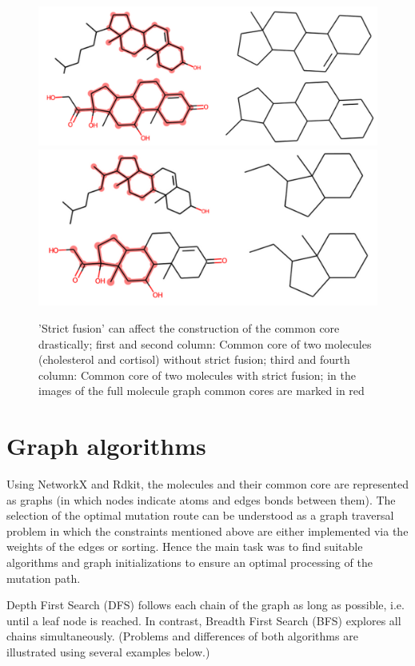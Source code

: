 \begin{figure}
\includegraphics[scale=0.4]{sterols_wo_strictfusion}\includegraphics[scale=0.4]{sterols_w_strictfusion}

\caption{'Strict fusion' can affect the construction of the common core drastically; first and second column: Common core of two molecules (cholesterol
and cortisol) without strict fusion; third and fourth column: Common
core of two molecules with strict fusion; in the images of the full molecule graph common cores are marked in red }

\end{figure}


\section{Graph algorithms}

Using NetworkX and Rdkit, the molecules and their common core are
represented as graphs (in which nodes indicate atoms and edges bonds
between them). The selection of the optimal mutation route can be
understood as a graph traversal problem in which the constraints mentioned
above are either implemented via the weights of the edges or sorting.
Hence the main task was to find suitable algorithms and graph initializations
to ensure an optimal processing of the mutation path.

Depth First Search (DFS) follows each chain of the graph as long as
possible, i.e. until a leaf node is reached. In contrast, Breadth
First Search (BFS) explores all chains simultaneously.\cite{Even.2012}
(Problems and differences of both algorithms are illustrated using
several examples below.)

